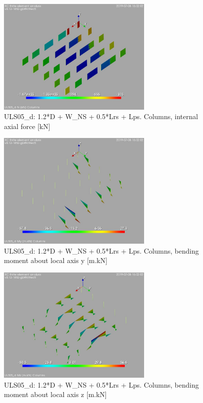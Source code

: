 \begin{figure}
\begin{center}
\includegraphics[width=75mm]{annex_res_columns/graphics/resSimplLC/ULS05_dcolumnsN}
\caption{ULS05\_d: 1.2*D + W\_NS + 0.5*Lrs + Lps. Columns, internal axial force [kN]}
\end{center}
\end{figure}
\begin{figure}
\begin{center}
\includegraphics[width=75mm]{annex_res_columns/graphics/resSimplLC/ULS05_dcolumnsMy}
\caption{ULS05\_d: 1.2*D + W\_NS + 0.5*Lrs + Lps. Columns, bending moment about local axis y [m.kN]}
\end{center}
\end{figure}
\begin{figure}
\begin{center}
\includegraphics[width=75mm]{annex_res_columns/graphics/resSimplLC/ULS05_dcolumnsMz}
\caption{ULS05\_d: 1.2*D + W\_NS + 0.5*Lrs + Lps. Columns, bending moment about local axis z [m.kN]}
\end{center}
\end{figure}
